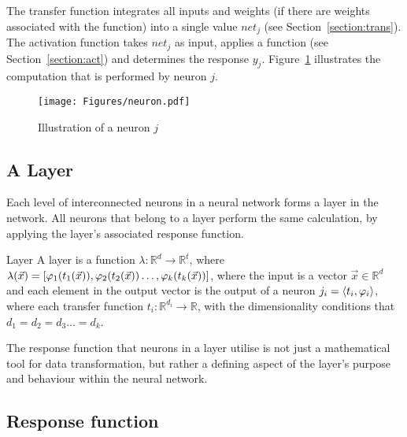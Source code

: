 The transfer function integrates all inputs and weights (if there are weights associated with the function) into a single value $net_j$ (see Section~\ref{section:trans}). The activation function takes $net_j$ as input, applies a function (see Section~\ref{section:act}) and determines the response $y_j$. Figure~\ref{fig:neuron} illustrates the computation that is performed by neuron $j$.


\begin{figure}[ht!]
	\begin{center}
		\texttt{[image: Figures/neuron.pdf]}
	\end{center}
	\caption{Illustration of a neuron $j$}
	\label{fig:neuron}
\end{figure} 



\subsection{A Layer}

Each level of interconnected neurons in a neural network forms a layer in the network. All neurons that belong to a layer perform the same calculation, by applying the layer's associated response function.

\begin{Definition}{Layer}{}
A layer is a function $\lambda: \mathbb{R}^d \to \mathbb{R}^t$, where $\lambda(\vec{x}) = [\varphi_1(t_1(\vec{x})), \varphi_2(t_2(\vec{x})) \dots, \varphi_k(t_k(\vec{x}))] $, where the input is a vector $\vec{x}\in \mathbb{R}^d$ and each element in the output vector is the output of a neuron $j_i = \langle t_i, \varphi_i \rangle$, where each transfer function $t_i:\mathbb{R}^{d_i} \to \mathbb{R}$, with the dimensionality
conditions that $d_1 = d_2 = d_3 \dots = d_k$.
\end{Definition}

The response function that neurons in a layer utilise is not just a mathematical tool for data transformation, but rather a defining aspect of the layer's purpose and behaviour within the neural network. 

\subsection{Response function}

